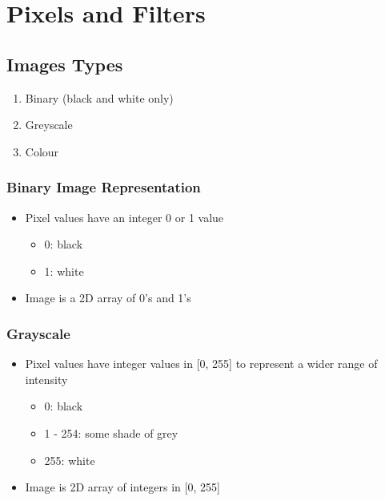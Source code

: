 \documentclass[letterpaper,12pt]{article}
\begin{document}
\section{Pixels and Filters}
\subsection{Images Types}
\begin{enumerate}
 \item Binary (black and white only)
 \item Greyscale
 \item Colour
\end{enumerate}

\subsubsection{Binary Image Representation}
\begin{itemize}
 \item Pixel values have an integer 0 or 1 value
       \begin{itemize}
        \item 0: black
        \item 1: white
       \end{itemize}
 \item Image is a 2D array of 0's and 1's
\end{itemize}

\subsubsection{Grayscale}
\begin{itemize}
 \item Pixel values have integer values in [0, 255] to represent a wider range of intensity
       \begin{itemize}
        \item 0: black
        \item 1 - 254: some shade of grey
        \item 255: white
       \end{itemize}
 \item Image is 2D array of integers in [0, 255]
\end{itemize}
\end{document}
